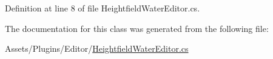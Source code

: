 Definition at line 8 of file Heightfield\+Water\+Editor.\+cs.



The documentation for this class was generated from the following file\+:\begin{DoxyCompactItemize}
\item 
Assets/\+Plugins/\+Editor/\mbox{\hyperlink{_heightfield_water_editor_8cs}{Heightfield\+Water\+Editor.\+cs}}\end{DoxyCompactItemize}
